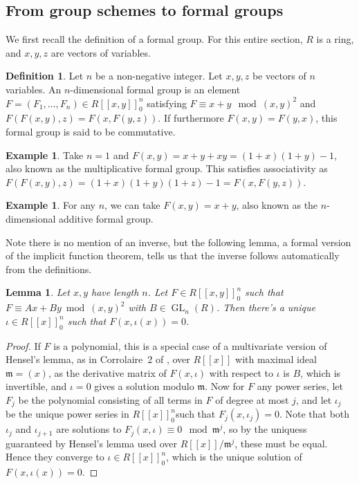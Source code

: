 \documentclass[12pt]{article}
\newcommand{\m}{\mathfrak{m}}
\DeclareMathOperator{\GL}{GL}
\theoremstyle{plain}
\newtheorem{lem}[thm]{Lemma} %
\theoremstyle{definition}
\newtheorem{defn}[thm]{Definition} %
\newtheorem{exmp}[thm]{Example} %
\theoremstyle{remark}
\begin{document}
\subsection{From group schemes to formal groups}
We first recall the definition of a formal group. For this entire section, $R$ is a ring, and $x,y,z$ are vectors of variables.
\begin{defn}
\label{defn:formalgroup}
Let $n$ be a non-negative integer. Let $x,y,z$ be vectors of $n$ variables. An $n$-dimensional formal group is an element $F = (F_1,\dots,F_n) \in R[[x,y]]_0^n$ satisfying $F \equiv x + y \mod (x,y)^2$ and $F(F(x,y),z) = F(x,F(y,z))$. If furthermore $F(x,y) = F(y,x)$, this formal group is said to be commutative.
\end{defn}
\begin{exmp}
\label{exmp:gmformalgroup}
Take $n=1$ and $F(x,y) = x + y + xy = (1+x)(1+y)-1$, also known as the multiplicative formal group. This satisfies associativity as $F(F(x,y),z) = (1+x)(1+y)(1+z)-1 = F(x,F(y,z))$.
\end{exmp}
\begin{exmp}
\label{exmp:ganformalgroup}
For any $n$, we can take $F(x,y) = x+ y$, also known as the $n$-dimensional additive formal group.
\end{exmp}
Note there is no mention of an inverse, but the following lemma, a formal version of the implicit function theorem, tells us that the inverse follows automatically from the definitions.
\begin{lem}
\label{lem:implicitfunction}
Let $x,y$ have length $n$. Let $F \in R[[x,y]]_0^n$ such that $F \equiv Ax + By \bmod (x,y)^2$ with $B \in \GL_n(R)$. Then there's a unique $\iota \in R[[x]]_0^n$ such that $F(x,\iota(x)) = 0$. 
\end{lem}
\begin{proof}
If $F$ is a polynomial, this is a special case of a multivariate version of Hensel's lemma, as in Corrolaire~2 of \cite[III,4.5]{BourbakiCA}, over $R[[x]]$ with maximal ideal $\m = (x)$, as the derivative matrix of $F(x,\iota)$ with respect to $\iota$ is $B$, which is invertible, and $\iota = 0$ gives a solution modulo $\m$. Now for $F$ any power series, let $F_j$ be the polynomial consisting of all terms in $F$ of degree at most $j$, and let $\iota_j$ be the unique power series in $R[[x]]_0^n$such that $F_j(x,\iota_j) = 0$. Note that both $\iota_j$ and $\iota_{j+1}$ are solutions to $F_j(x,\iota) \equiv 0 \mod \m^j$, so by the uniquess guaranteed by Hensel's lemma used over $R[[x]]/\m^j$, these must be equal. Hence they converge to $\iota \in R[[x]]_0^n$, which is the unique solution of $F(x,\iota(x)) = 0$.
\end{proof}
\end{document}
